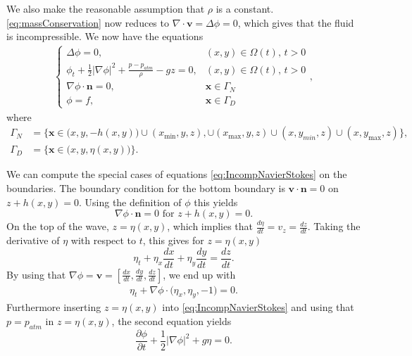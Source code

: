 \documentclass[11pt]{article}
\begin{document}
We also make the reasonable assumption that $\rho$ is a constant. \eqref{eq:massConservation} now reduces to
$\nabla \cdot \bm{v} = \Delta \phi = 0$, which gives that the fluid is incompressible. We now have
the equations
\begin{align}
    \label{eq:IncompNavierStokes}
    \begin{cases}
        \Delta \phi = 0,                                                 &    (x,y) \in \Omega(t), \, t > 0 \\
        \phi_t + \frac{1}{2}|\nabla \phi|^2 + \frac{p-p_{atm}}{\rho} - g z = 0,
                                                                         &    (x,y) \in \Omega(t), \, t > 0 \\
        \nabla \phi \cdot \bm{n} = 0,                                    &    \bm{x} \in \Gamma_N \\
        \phi = f,                                                        &    \bm{x} \in \Gamma_D
    \end{cases},
\end{align}
where
\begin{align*}
    \Gamma_N & = \big\{\bm{x} \in \big(x,y,-h(x,y)\big) \cup (x_{\min}, y, z), \cup (x_{\max}, y, z) \cup (x, y_{min}, z) \cup (x, y_{\max}, z)\big\}, \\
    \Gamma_D & = \big\{ \bm{x} \in \big(x,y, \eta(x,y)\big) \big\}.
\end{align*}

We can compute the special cases of equations \eqref{eq:IncompNavierStokes} on the boundaries. 
The boundary condition for the bottom boundary is $\bm{v} \cdot \bm{n} = 0 $ on $z + h(x,y) = 0$. Using the definition of $\phi$ this yields
\begin{equation}
    \label{eq:phit}%
    \nabla \phi  \cdot \bm{n} = 0 \text{ for } z + h(x,y) = 0. 
\end{equation}
On the top of the wave, $z = \eta(x,y)$, which implies that $\frac{d\eta}{dt} = v_z = \frac{dz}{dt}$. Taking the derivative of $\eta$ with respect to $t$, this gives for $z = \eta(x,y)$
\begin{equation*}
    \eta_t + \eta_x\frac{dx}{dt} + \eta_y\frac{dy}{dt} = \frac{dz}{dt}. 
\end{equation*}
By using that $\nabla\phi = \bm{v} = [\frac{dx}{dt}, \frac{dy}{dt}, \frac{dz}{dt}]$, we end up with
\begin{align}
    \label{eq:etaEq}%
    \eta_t + \nabla\phi\cdot \big(\eta_x, \eta_y, - 1\big) = 0.
\end{align}
Furthermore inserting $z = \eta(x,y)$ into \eqref{eq:IncompNavierStokes} and using that $p = p_{atm}$ in $z = \eta(x,y)$, the second equation yields
\begin{equation}
    \label{eq:phiEq}
    \frac{\partial \phi }{\partial t} + \frac{1}{2}|\nabla \phi |^2 + g\eta = 0.
\end{equation}
%
%
\end{document}
